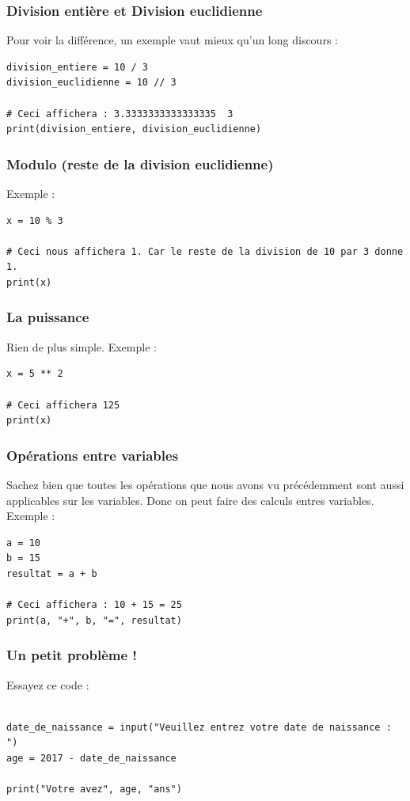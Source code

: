 \documentclass[12pt]{article}
\begin{document}
        \subsubsection{Division entière et Division euclidienne}
            Pour voir la différence, un exemple vaut mieux qu'un long discours :
            \begin{lstlisting}[style=code]
division_entiere = 10 / 3
division_euclidienne = 10 // 3

# Ceci affichera : 3.3333333333333335  3
print(division_entiere, division_euclidienne)
            \end{lstlisting}

        \subsubsection{Modulo (reste de la division euclidienne)}
            Exemple :
            \begin{lstlisting}[style=code, breaklines=false]
x = 10 % 3

# Ceci nous affichera 1. Car le reste de la division de 10 par 3 donne 1.
print(x) 
            \end{lstlisting}
        \subsubsection{La puissance}
            Rien de plus simple. Exemple :
            \begin{lstlisting}[style=code]
x = 5 ** 2

# Ceci affichera 125
print(x)
            \end{lstlisting}
        

        \subsubsection{Opérations entre variables}
            Sachez bien que toutes les opérations que nous avons vu précédemment sont aussi applicables sur les variables.
            Donc on peut faire des calculs entres variables. Exemple : 
            \begin{lstlisting}[style=code]
a = 10
b = 15
resultat = a + b

# Ceci affichera : 10 + 15 = 25
print(a, "+", b, "=", resultat)
            \end{lstlisting}

        \subsubsection{Un petit problème !}
            Essayez ce code : 
            \begin{lstlisting}[style=code, breaklines=false]

date_de_naissance = input("Veuillez entrez votre date de naissance : ")
age = 2017 - date_de_naissance

print("Votre avez", age, "ans")
            \end{lstlisting}
\end{document}
